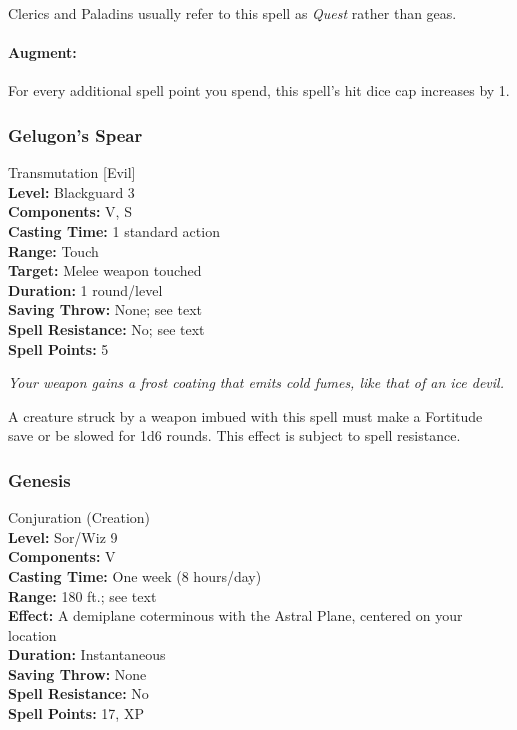 Clerics and Paladins usually refer to this spell as \emph{Quest} rather than geas.

\paragraph{Augment:} For every additional spell point you spend, this spell's hit dice cap increases by 1.

\subsubsection{Gelugon's Spear}
\label{Spell:GelugonsSpear}
Transmutation [Evil]
\\ \textbf{Level:} Blackguard 3
\\ \textbf{Components:} V, S
\\ \textbf{Casting Time:} 1 standard action
\\ \textbf{Range:} Touch
\\ \textbf{Target:} Melee weapon touched
\\ \textbf{Duration:} 1 round/level
\\ \textbf{Saving Throw:} None; see text
\\ \textbf{Spell Resistance:} No; see text
\\ \textbf{Spell Points:} 5

\emph{Your weapon gains a frost coating that emits cold fumes, like that of an ice devil.}

A creature struck by a weapon imbued with this spell must make a Fortitude save or be slowed for 1d6 rounds.
This effect is subject to spell resistance.

\subsubsection{Genesis}
\label{Spell:Genesis}
Conjuration (Creation)
\\ \textbf{Level:} Sor/Wiz 9
\\ \textbf{Components:} V
\\ \textbf{Casting Time:} One week (8 hours/day)
\\ \textbf{Range:} 180 ft.; see text
\\ \textbf{Effect:} A demiplane coterminous with the Astral Plane, centered on your location
\\ \textbf{Duration:} Instantaneous
\\ \textbf{Saving Throw:} None
\\ \textbf{Spell Resistance:} No
\\ \textbf{Spell Points:} 17, XP

